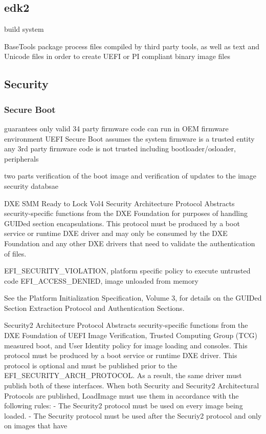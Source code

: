 \subsection{edk2}
build system

BaseTools package process files compiled by third party tools, as well as text and Unicode files in order to create UEFI or PI compliant binary image files
\cite{tianocore-edk2}

\subsection{Security}

\subsubsection{Secure Boot}
guarantees only valid 34 party firmware code can run in OEM firmware environment
UEFI Secure Boot assumes the system firmware is a trusted entity
any 3rd party firmware code is not trusted
including bootloader/osloader, peripherals

two parts
verification of the boot image and verification of updates to the image security databsae
\cite{understanding-uefi-secure-boot-chain}

DXE SMM Ready to Lock Vol4
Security Architecture Protocol
Abstracts security-specific functions from the DXE Foundation for purposes of handling GUIDed
section encapsulations. This protocol must be produced by a boot service or runtime DXE driver
and may only be consumed by the DXE Foundation and any other DXE drivers that need to validate
the authentication of files.

EFI_SECURITY_VIOLATION, platform specific policy to execute untrusted code
EFI_ACCESS_DENIED, image unloaded from memory

See the Platform Initialization Specification, Volume 3, for details on
the GUIDed Section Extraction Protocol and Authentication Sections.

Security2 Architecture Protocol
Abstracts security-specific functions from the DXE Foundation of UEFI Image Verification,
Trusted Computing Group (TCG) measured boot, and User Identity policy for image loading and
consoles. This protocol must be produced by a boot service or runtime DXE driver.
This protocol is optional and must be published prior to the EFI_SECURITY_ARCH_PROTOCOL.
As a result, the same driver must publish both of these interfaces.
When both Security and Security2 Architectural Protocols are published, LoadImage must use
them in accordance with the following rules:
- The Security2 protocol must be used on every image being loaded.
- The Security protocol must be used after the Securiy2 protocol and only on images that have

